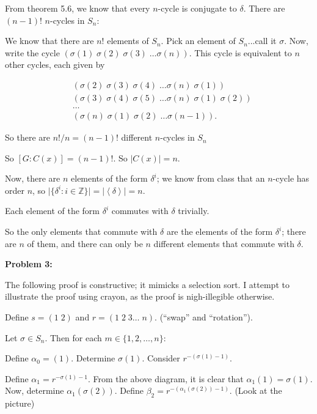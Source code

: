 \documentclass[a4paper,12pt]{article}
\newcommand{\tab}{\hspace{4mm}} %
\newcommand{\shunt}{\vspace{20mm}}
\newcommand{\absval}[1]{\lvert #1 \rvert}
\newcommand{\anbrack}[1]{\left\langle #1 \right\rangle}
\newcommand{\al}{\alpha} %
\newcommand{\be}{\beta}
\newcommand{\de}{\delta}
\newcommand{\Z}{\mathbb{Z}}
\begin{document}
From theorem 5.6, we know that every $n$-cycle is conjugate to $\de$. There are $(n-1)!$ $n$-cycles in $S_n$:

\tab We know that there are $n!$ elements of $S_n$. Pick an element of $S_n$...call it $\sigma$. Now, write the cycle $(\sigma(1) \; \sigma(2) \; \sigma(3) \; \ldots \sigma(n))$. This cycle is equivalent to $n$ other cycles, each given by

\begin{align*}
&(\sigma(2) \; \sigma(3) \; \sigma(4) \; \ldots \sigma(n) \; \sigma(1))\\
&(\sigma(3) \; \sigma(4) \; \sigma(5) \; \ldots \sigma(n) \; \sigma(1) \; \sigma(2))\\
&\ldots \\
&(\sigma(n) \; \sigma(1) \; \sigma(2) \; \ldots \sigma(n-1)).
\end{align*}

\tab So there are $n!/n = (n-1)!$ different $n$-cycles in $S_n$

So $[G:C(x)] = (n-1)!$. So $\absval{C(x)} = n$.

Now, there are $n$ elements of the form $\de^i$; we know from class that an $n$-cycle has order $n$, so $\absval{\{\de^i: i \in \Z\}}=\absval{\anbrack{\de}} = n$.

Each element of the form $\de^i$ commutes with $\de$ trivially.

So the only elements that commute with $\de$ are the elements of the form $\de^i$; there are $n$ of them, and there can only be $n$ different elements that commute with $\de$.

\shunt

{\bf Problem 3:}

The following proof is constructive; it mimicks a selection sort. I attempt to illustrate the proof using crayon, as the proof is nigh-illegible otherwise.

Define $s = (1 \; 2)$ and $r = (1 \; 2 \; 3 \ldots \; n)$. (``swap'' and ``rotation'').

\shunt %

\shunt

Let $\sigma \in S_n$. Then for each $m \in \{1,2, \ldots ,n\}$:

\tab Define $\al_0 = (1)$. Determine $\sigma(1)$. Consider $r^{-(\sigma(1)-1)}$.

\shunt %

\shunt

\tab Define $\al_1 = r^{-\sigma(1) -1}$. From the above diagram, it is clear that $\al_1(1) = \sigma(1)$. Now, determine $\al_1(\sigma(2))$. Define $\be_2 = r^{-(\al_1(\sigma(2))-1)}$. (Look at the picture)
\end{document}
